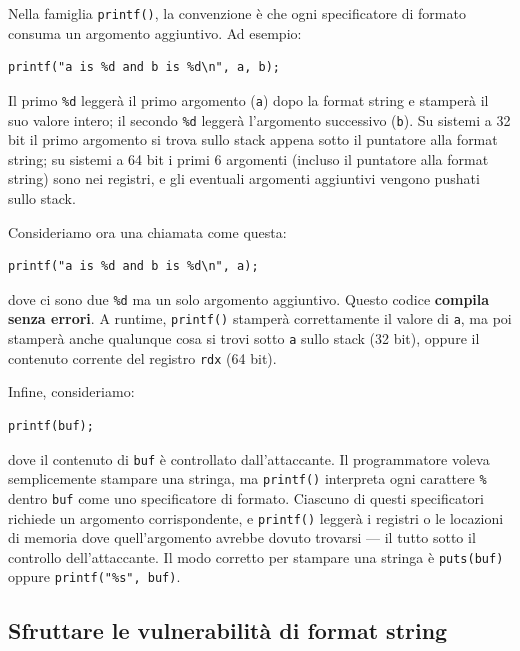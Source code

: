 \documentclass{article}
\begin{document}
Nella famiglia \texttt{printf()}, la convenzione è che ogni specificatore di formato consuma un argomento aggiuntivo. Ad esempio:

\begin{verbatim}
printf("a is %d and b is %d\n", a, b);
\end{verbatim}

Il primo \texttt{\%d} leggerà il primo argomento (\texttt{a}) dopo la format string e stamperà il suo valore intero; il secondo \texttt{\%d} leggerà l'argomento successivo (\texttt{b}). Su sistemi a 32 bit il primo argomento si trova sullo stack appena sotto il puntatore alla format string; su sistemi a 64 bit i primi 6 argomenti (incluso il puntatore alla format string) sono nei registri, e gli eventuali argomenti aggiuntivi vengono pushati sullo stack.

Consideriamo ora una chiamata come questa:

\begin{verbatim}
printf("a is %d and b is %d\n", a);
\end{verbatim}

dove ci sono due \texttt{\%d} ma un solo argomento aggiuntivo. Questo codice \textbf{compila senza errori}. A runtime, \texttt{printf()} stamperà correttamente il valore di \texttt{a}, ma poi stamperà anche qualunque cosa si trovi sotto \texttt{a} sullo stack (32 bit), oppure il contenuto corrente del registro \texttt{rdx} (64 bit).

Infine, consideriamo:

\begin{verbatim}
printf(buf);
\end{verbatim}

dove il contenuto di \texttt{buf} è controllato dall'attaccante. Il programmatore voleva semplicemente stampare una stringa, ma \texttt{printf()} interpreta ogni carattere \texttt{\%} dentro \texttt{buf} come uno specificatore di formato. Ciascuno di questi specificatori richiede un argomento corrispondente, e \texttt{printf()} leggerà i registri o le locazioni di memoria dove quell'argomento avrebbe dovuto trovarsi — il tutto sotto il controllo dell'attaccante. Il modo corretto per stampare una stringa è \texttt{puts(buf)} oppure \texttt{printf("\%s", buf)}.

\subsection*{Sfruttare le vulnerabilità di format string}
\end{document}
